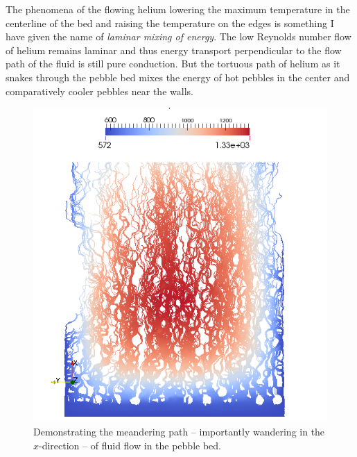 The phenomena of the flowing helium lowering the maximum temperature in the centerline of the bed and raising the temperature on the edges is something I have given the name of \textit{laminar mixing of energy}. The low Reynolds number flow of helium remains laminar and thus energy transport perpendicular to the flow path of the fluid is still pure conduction. But the tortuous path of helium as it snakes through the pebble bed mixes the energy of hot pebbles in the center and comparatively cooler pebbles near the walls.



\begin{figure}[t]
    \centering
    \includegraphics[width=\singleimagewidth]{chapters/figures/lbm/lbm-streamlines}
    \caption{Demonstrating the meandering path -- importantly wandering in the $x$-direction -- of fluid flow in the pebble bed.}\label{fig:lbm-streamlines}
\end{figure}

